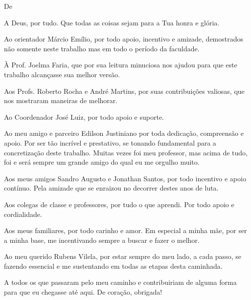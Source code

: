 \begin{agradecimentos}

De \imprimirAutorUm
\newline
\par A Deus, por tudo. Que todas as coisas sejam para a Tua honra e glória.

\par Ao orientador Márcio Emílio, por todo apoio, incentivo e amizade, demostrados não somente neste trabalho mas em todo o período da faculdade.

\par À Prof. Joelma Faria, que por sua leitura minuciosa nos ajudou para que este trabalho alcançasse sua melhor versão.

\par Aos Profs. Roberto Rocha e André Martins, por suas contribuições valiosas, que nos mostraram maneiras de melhorar.

\par Ao Coordenador José Luiz, por todo apoio e suporte.

\par Ao meu amigo e parceiro Edilson Justiniano por toda dedicação, compreensão e apoio. Por ser tão incrível e prestativo, se tonando fundamental para a concretização deste trabalho. Muitas vezes foi meu professor, mas acima de tudo, foi e será sempre um grande amigo do qual eu me orgulho muito.

\par Aos meus amigos Sandro Augusto e Jonathan Santos, por todo incentivo e apoio contínuo. Pela amizade que se enraizou no decorrer destes anos de luta.

\par Aos colegas de classe e professores, por tudo o que aprendi. Por todo apoio e cordialidade.

\par Aos meus familiares, por todo carinho e amor. Em especial a minha mãe, por ser a minha base, me incentivando sempre a buscar e fazer o melhor. 

\par Ao meu querido Rubens Vilela, por estar sempre do meu lado, a cada passo, se fazendo essencial e me sustentando em todas as etapas desta caminhada.

\par A todos os que passaram pelo meu caminho e contribuiriam de alguma forma para que eu chegasse até aqui. De coração, obrigada!






\end{agradecimentos}
